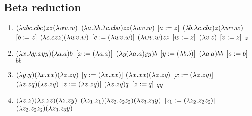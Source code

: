 \documentclass[11pt]{article}
\begin{document}
\subsection{Beta reduction}
\label{sec:org31bfdd7}
\begin{enumerate}
\item \(({\lambda}abc.cba) zz ({\lambda}wv.w) \\\)
\(({\lambda}a.{\lambda}b.{\lambda}c.cba) zz ({\lambda}wv.w) \\\)
\([a := z] \\\)
\(({\lambda}b.{\lambda}c.cbz) z ({\lambda}wv.w) \\\)
\([b := z] \\\)
\(({\lambda}c.czz) ({\lambda}wv.w) \\\)
\([c := ({\lambda}wv.w)] \\\)
\(({\lambda}wv.w) z z \\\)
\([ w := z] \\\)
\(({\lambda}v.z) \\\)
\([ v := z ] \\\)
\(z\)
\item \(({\lambda}x.{\lambda}y.xyy)({\lambda}a.a)b \\\)
\([x := ({\lambda}a.a)] \\\)
\(({\lambda}y({\lambda}a.a)yy)b \\\)
\([ y := ({\lambda}b.b)] \\\)
\(({\lambda}a.a)bb \\\)
\([ a := b ] \\\)
\(bb\)
\item \(({\lambda}y.y)({\lambda}x.xx)({\lambda}z.zq) \\\)
\([y := ({\lambda}x.xx)] \\\)
\(({\lambda}x.xx)({\lambda}z.zq) \\\)
\([x := ({\lambda}z.zq)] \\\)
\(({\lambda}z.zq)({\lambda}z.zq) \\\)
\([z := ({\lambda}z.zq)] \\\)
\(({\lambda}z.zq)q \\\)
\([ z := q ] \\\)
\(qq\)
\item \(({\lambda}z.z)({\lambda}z.zz)({\lambda}z.zy) \\\)
\(({\lambda}z_1.z_1)({\lambda}z_2.z_2z_2)({\lambda}z_3.z_3y) \\\)
\([z_1 := ({\lambda}z_2.z_2z_2)] \\\)
\(({\lambda}z_2.z_2z_2)({\lambda}z_3.z_3y) \\\)

\end{enumerate}
\end{document}
